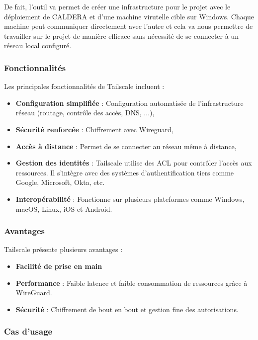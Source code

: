 \documentclass[12pt,letterpaper]{article}
\begin{document}
\bigskip

De fait, l'outil va permet de créer une infrastructure pour le projet avec le déploiement de CALDERA et d'une machine virutelle cible sur Windows. Chaque machine peut communiquer directement avec l'autre et cela va nous permettre de travailler sur le projet de manière efficace sans nécessité de se connecter à un réseau local configuré.

\subsubsection{Fonctionnalités}

Les principales fonctionnalités de Tailscale incluent :
\begin{itemize}
    \item \textbf{Configuration simplifiée} : Configuration automatisée de l'infrastructure réseau (routage, contrôle des accès, DNS, ...),
    \item \textbf{Sécurité renforcée} : Chiffrement avec Wireguard,
    \item \textbf{Accès à distance} : Permet de se connecter au réseau même à distance,
    \item \textbf{Gestion des identités} : Tailscale utilise des ACL pour contrôler l'accès aux ressources. Il s'intègre avec des systèmes d'authentification tiers comme Google, Microsoft, Okta, etc.
    \item \textbf{Interopérabilité} : Fonctionne sur plusieurs plateformes comme Windows, macOS, Linux, iOS et Android.
\end{itemize}

\subsubsection{Avantages}

Tailscale présente plusieurs avantages :
\begin{itemize}
    \item \textbf{Facilité de prise en main}
    \item \textbf{Performance} : Faible latence et faible consommation de ressources grâce à WireGuard.
    \item \textbf{Sécurité} : Chiffrement de bout en bout et gestion fine des autorisations.
\end{itemize}

\subsubsection{Cas d'usage}
\end{document}
